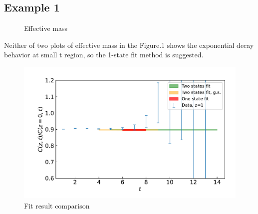 \documentclass{article}
\begin{document}
\subsection{Example 1}
\begin{figure}[htbp]
    \centering
    \centering
    \caption{Effective mass}
\end{figure}

Neither of two plots of effective mass in the Figure.1 shows the exponential decay behavior at small t region, so the 1-state fit method is suggested.

\begin{figure}
    \centering
    \includegraphics[height=7cm,width=11.3cm]{fit_fig/b_fit_result.pdf}
    \caption{Fit result comparison}
\end{figure}
\end{document}

